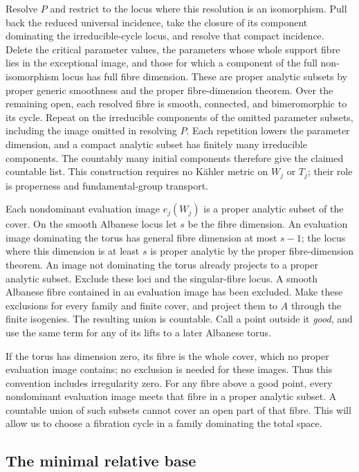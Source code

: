 Resolve \(P\) and restrict to the locus where this resolution is an
isomorphism. Pull back the reduced universal incidence, take the
closure of its component dominating the irreducible-cycle locus,
and resolve that compact incidence. Delete the critical parameter
values, the
parameters whose whole support fibre lies in the exceptional image,
and those for which a component of the full non-isomorphism locus
has full fibre dimension.
These are proper analytic subsets by proper generic smoothness and
the proper fibre-dimension theorem. Over the remaining open, each
resolved fibre is smooth, connected, and bimeromorphic to its cycle.
Repeat on the irreducible components of the omitted parameter subsets,
including the image omitted in resolving \(P\). Each repetition lowers
the parameter dimension, and a compact analytic subset has finitely
many irreducible components. The countably many initial components
therefore give the claimed countable list. This construction requires
no K\"ahler metric on \(W_j\) or \(T_j\); their role is properness
and fundamental-group transport.

Each nondominant evaluation image \(e_j(W_j)\) is a proper analytic
subset of the cover. On the smooth Albanese locus let \(s\) be the
fibre dimension. An evaluation image dominating the torus has
general fibre dimension at most \(s-1\); the locus where this
dimension is at least \(s\) is proper analytic by the proper
fibre-dimension theorem. An image not dominating the torus already
projects to a proper analytic subset. Exclude these loci and the
singular-fibre locus. A smooth Albanese fibre contained in an evaluation image
has been excluded. Make these exclusions for every family and finite
cover, and project them to \(A\) through the finite isogenies.
The resulting union is countable. Call a point outside it \emph{good},
and use the same term for any of its lifts to a later Albanese torus.

If the torus has dimension zero, its fibre is the whole cover,
which no proper evaluation image contains; no exclusion is needed
for these images. Thus this convention includes irregularity zero.
For any fibre above a good point, every nondominant evaluation
image meets that fibre in a proper analytic subset. A countable
union of such subsets cannot cover an open part of that fibre.
This will allow us to choose a fibration cycle in a family
dominating the total space.

\subsection{The minimal relative base}

